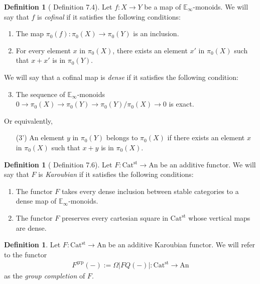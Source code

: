 \documentclass[a4paper,dvipdfmx,11pt,reqno]{amsart}
\DeclareMathOperator{\grp}{grp}
\newcommand{\An}{\mathrm{An}}
\newcommand{\Catst}{\mathrm{Cat^{st}}}
\newcommand{\Einf}{\mathbb{E}_{\infty}}
\theoremstyle{definition}
\newtheorem{definition}[theorem]{Definition}
\begin{document}
\begin{definition}[\cite{HLS23} Definition 7.4] \label{HLS23.def.7.4}
  Let $f : X \to Y$ be a map of $\Einf$-monoids.
  We will say that $f$ is \textit{cofinal} if it satisfies the following conditions:
  \begin{enumerate}
    \item The map $\pi_0(f) : \pi_0(X) \to \pi_0(Y)$ is an inclusion.
    \item For every element $x$ in $\pi_0(X)$, there exists an element $x'$ in $\pi_0(X)$ such that $x+x'$ is in $\pi_0(Y)$.
  \end{enumerate}
  We will say that a cofinal map is \textit{dense} if it satisfies the following condition:
  \begin{enumerate}[resume]
    \setcounter{enumi}{2}
    \item The sequence of $\Einf$-monoids $0 \to \pi_0(X) \to \pi_0(Y) \to \pi_0(Y)/\pi_0(X) \to 0$ is exact. 
  \end{enumerate}
  Or equivalently, 
  \begin{itemize}
    \item[(3')] An element $y$ in $\pi_0(Y)$ belongs to $\pi_0(X)$ if there exists an element $x$ in $\pi_0(X)$ such that $x+y$ is in $\pi_0(X)$.
  \end{itemize}
\end{definition}

\begin{definition}[\cite{HLS23} Definition 7.6] \label{HLS23.def.7.6}
  Let $F : \Catst \to \An$ be an additive functor.
  We will say that $F$ is \textit{Karoubian} if it satisfies the following conditions:
  \begin{enumerate}
    \item The functor $F$ takes every dense inclusion between stable categories to a dense map of $\Einf$-monoids.
    \item The functor $F$ preserves every cartesian square in $\Catst$ whose vertical maps are dense.
  \end{enumerate}
\end{definition}

\begin{definition} \label{Ber.p171}
  Let $F : \Catst \to \An$ be an additive Karoubian functor.
  We will refer to the functor
  \begin{align*}
    F^{\grp}(-) := \Omega|FQ(-)| : \Catst \to \An
  \end{align*}
  as the \textit{group completion} of $F$.
\end{definition}
\end{document}
